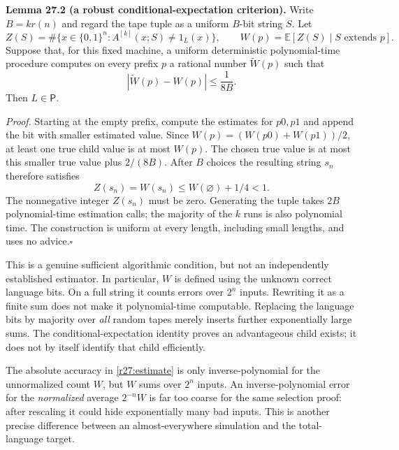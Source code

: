 \documentclass[11pt,a4paper]{article}
\numberwithin{equation}{section}
\begin{document}
\textbf{Lemma 27.2 (a robust conditional-expectation criterion).}
Write $B=kr(n)$ and regard the tape tuple as a uniform $B$-bit string
$S$. Let
\[
 Z(S)=\#\{x\in\{0,1\}^n:A^{[k]}(x;S)\ne1_L(x)\},
 \qquad W(p)=\mathbb E[Z(S)\mid S\text{ extends }p].
\]
Suppose that, for this fixed machine, a uniform deterministic
polynomial-time procedure computes on every prefix $p$ a rational number
$\widetilde W(p)$ such that
\begin{equation}\label{r27:estimate}
             |\widetilde W(p)-W(p)|\le\frac1{8B}.
\end{equation}
Then $L\in\mathsf P$.

\emph{Proof.} Starting at the empty prefix, compute the estimates for
$p0,p1$ and append the bit with smaller estimated value. Since
$W(p)=(W(p0)+W(p1))/2$, at least one true child value is at most $W(p)$.
The chosen true value is at most this smaller true value plus $2/(8B)$.
After $B$ choices the resulting string $s_n$ therefore satisfies
\[
          Z(s_n)=W(s_n)\le W(\varnothing)+1/4<1.
\]
The nonnegative integer $Z(s_n)$ must be zero. Generating the tuple takes
$2B$ polynomial-time estimation calls; the majority of the $k$ runs is
also polynomial time. The construction is uniform at every length,
including small lengths, and uses no advice.\hfill$\square$

This is a genuine sufficient algorithmic condition, but not an
independently established estimator. In particular, $W$ is defined using
the unknown correct language bits. On a full string it counts errors over
$2^n$ inputs. Rewriting it as a finite sum does not make it polynomial-time
computable. Replacing the language bits by majority over \emph{all}
random tapes merely inserts further exponentially large sums. The
conditional-expectation identity proves an advantageous child exists;
it does not by itself identify that child efficiently.

The absolute accuracy in \eqref{r27:estimate} is only inverse-polynomial
for the unnormalized count $W$, but $W$ sums over $2^n$ inputs. An
inverse-polynomial error for the \emph{normalized} average $2^{-n}W$
is far too coarse for the same selection proof: after rescaling it could
hide exponentially many bad inputs. This is another precise difference
between an almost-everywhere simulation and the total-language target.
\end{document}
